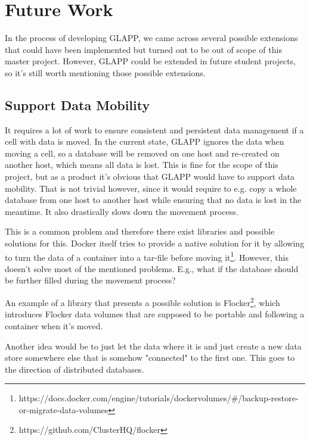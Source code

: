 \documentclass{seal_thesis}
\begin{document}
\chapter{Future Work}\label{ch:futurework}

In the process of developing GLAPP, we came across several possible extensions that could have been implemented but turned out to be out of scope of this master project.
However, GLAPP could be extended in future student projects, so it's still worth mentioning those possible extensions.

\section{Support Data Mobility}
It requires a lot of work to ensure consistent and persistent data management if a cell with data is moved.
In the current state, GLAPP ignores the data when moving a cell, so a database will be removed on one host and re-created on another host, which means all data is lost.
This is fine for the scope of this project, but as a product it's obvious that GLAPP would have to support data mobility.
That is not trivial however, since it would require to e.g. copy a whole database from one host to another host while ensuring that no data is lost in the meantime.
It also drastically slows down the movement process.

This is a common problem and therefore there exist libraries and possible solutions for this.
Docker itself tries to provide a native solution for it by allowing to turn the data of a container into a tar-file before moving it\footnote{https://docs.docker.com/engine/tutorials/dockervolumes/\#/backup-restore-or-migrate-data-volumes}.
However, this doesn't solve most of the mentioned problems. E.g., what if the database should be further filled during the movement process?

An example of a library that presents a possible solution is Flocker\footnote{https://github.com/ClusterHQ/flocker}, which introduces Flocker data volumes that are supposed to be portable and following a container when it's moved.

Another idea would be to just let the data where it is and just create a new data store somewhere else that is somehow "connected" to the first one. This goes to the direction of distributed databases.
\end{document}
